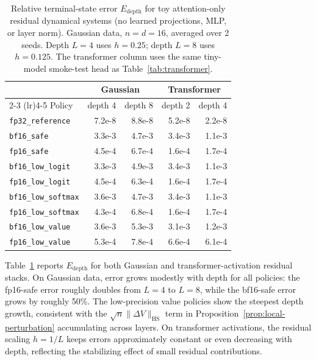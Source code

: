 \begin{table}[ht]
\centering
\caption{Relative terminal-state error $E_{\mathrm{depth}}$ for toy attention-only residual dynamical systems (no learned projections, MLP, or layer norm). Gaussian data, $n = d = 16$, averaged over 2 seeds. Depth $L = 4$ uses $h = 0.25$; depth $L = 8$ uses $h = 0.125$. The transformer column uses the same tiny-model smoke-test head as Table~\ref{tab:transformer}.}
\label{tab:residual}
\small
\begin{tabular}{l rr rr}
\toprule
& \multicolumn{2}{c}{Gaussian} & \multicolumn{2}{c}{Transformer} \\
\cmidrule(lr){2-3} \cmidrule(lr){4-5}
Policy & depth 4 & depth 8 & depth 2 & depth 4 \\
\midrule
\texttt{fp32\_reference}    & 7.2e-8 & 8.8e-8  & 5.2e-8 & 2.2e-8 \\
\texttt{bf16\_safe}         & 3.3e-3 & 4.7e-3  & 3.4e-3 & 1.1e-3 \\
\texttt{fp16\_safe}         & 4.5e-4 & 6.7e-4  & 1.6e-4 & 1.7e-4 \\
\midrule
\texttt{bf16\_low\_logit}   & 3.3e-3 & 4.9e-3  & 3.4e-3 & 1.1e-3 \\
\texttt{fp16\_low\_logit}   & 4.5e-4 & 6.3e-4  & 1.6e-4 & 1.7e-4 \\
\midrule
\texttt{bf16\_low\_softmax} & 3.6e-3 & 4.7e-3  & 3.4e-3 & 1.1e-3 \\
\texttt{fp16\_low\_softmax} & 4.3e-4 & 6.8e-4  & 1.6e-4 & 1.7e-4 \\
\midrule
\texttt{bf16\_low\_value}   & 3.6e-3 & 5.3e-3  & 3.1e-3 & 1.2e-3 \\
\texttt{fp16\_low\_value}   & 5.3e-4 & 7.8e-4  & 6.6e-4 & 6.1e-4 \\
\bottomrule
\end{tabular}
\end{table}

Table~\ref{tab:residual} reports $E_{\mathrm{depth}}$ for both Gaussian and transformer-activation residual stacks. On Gaussian data, error grows modestly with depth for all policies: the fp16-safe error roughly doubles from $L = 4$ to $L = 8$, while the bf16-safe error grows by roughly 50\%. The low-precision value policies show the steepest depth growth, consistent with the $\sqrt{n}\|\Delta V\|_{\mathrm{HS}}$ term in Proposition~\ref{prop:local-perturbation} accumulating across layers. On transformer activations, the residual scaling $h = 1/L$ keeps errors approximately constant or even decreasing with depth, reflecting the stabilizing effect of small residual contributions.

